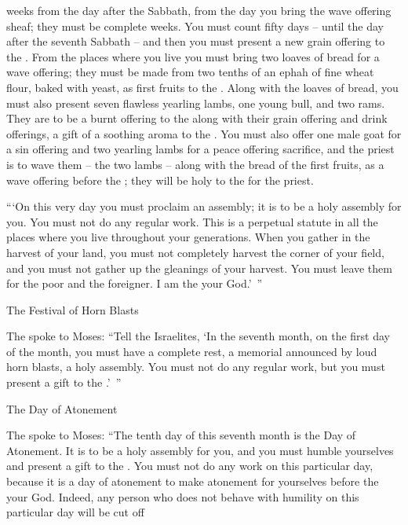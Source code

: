 {weeks from the day after
the Sabbath,
from the day
you bring
the wave offering
sheaf;
they must be complete
weeks.
You must count
fifty
days
– until
the day after
the seventh
Sabbath
– and then you must present
a new
grain offering
to the
{}.
From the places
where you live you must bring
two
loaves of bread
for a wave offering;
they must be
made from two
tenths of an ephah
of fine wheat flour,
baked
with yeast,
as first fruits
to the
{}.
Along with the loaves of bread,
you must also present seven
flawless
yearling
lambs,
one
young
bull,
and two
rams.
They are to be
a burnt offering
to the
{}
along with their grain offering
and drink offerings,
a gift
of a soothing
aroma
to the
{}.
You must also offer
one male
goat
for a
sin offering
and two
yearling
lambs
for a peace offering
sacrifice,
and the priest
is to wave them – the two lambs – along with the bread of the first fruits, as a wave offering before the
{}; they will be holy to the
{} for the priest.
\par }{\PP {}“‘On
this
very
day
you must proclaim
an assembly;
it is to be a holy
assembly for you. You must not
do
any
regular work.
This is a perpetual
statute
in all
the places
where you live throughout your generations.
When
you gather
in the harvest
of your land,
you must not
completely
harvest
the corner
of your field,
and you must not
gather
up the gleanings
of your harvest.
You must leave
them for the poor
and the foreigner.
I am
the {}
your God.’ ”
\par }{\SH The Festival of Horn Blasts
\par }{\PP {}The
{}
spoke
to
Moses:
“Tell
the Israelites,
‘In the seventh
month,
on the first
day of the month,
you must have a complete rest,
a memorial
announced by loud horn blasts,
a holy
assembly.
You must not
do
any
regular
work,
but you must present
a gift
to the
{}.’ ”
\par }{\SH The Day of Atonement
\par }{\PP {}The
{}
spoke
to
Moses:
“The tenth
day of this
seventh
month
is the Day
of Atonement.
It is
to be a holy
assembly
for you, and you must humble
yourselves
and present
a gift
to the
{}.
You must not
do
any
work
on this
particular
day,
because
it is
a day
of atonement
to make atonement
for yourselves before
the {}
your God.
Indeed,
any
person
who
does not
behave with humility
on this
particular
day
will be cut off
}
